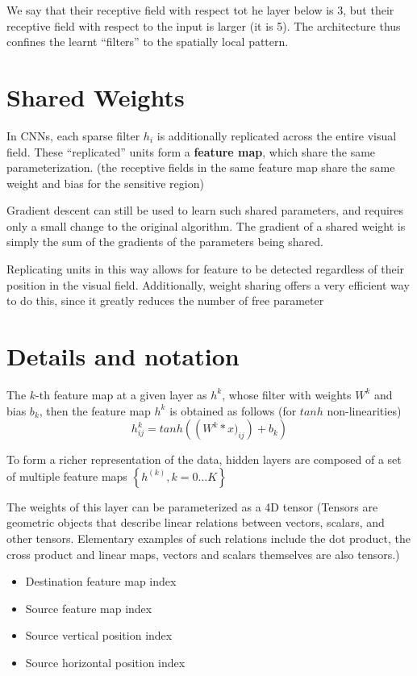 We say that their receptive field with respect tot he layer below is 3,
but their receptive field with respect to the input is larger (it is 5).
The architecture thus confines the learnt ``filters'' to the spatially
local pattern.

\section{Shared Weights}
In CNNs, each sparse filter $h_i$ is additionally replicated across the
entire visual field. These ``replicated'' units form a \textbf{feature
map}, which share the same parameterization. (the receptive fields in the
same feature map share the same weight and bias for the sensitive region)

Gradient descent can still be used to learn such shared parameters, and
requires only a small change to the original algorithm. The gradient of a
shared weight is simply the sum of the gradients of the parameters being
shared.

Replicating units in this way allows for feature to be detected regardless
of their position in the visual field. Additionally, weight sharing offers
a very efficient way to do this, since it greatly reduces the number of
free parameter 

\section{Details and notation}
The $k$-th feature map at a given layer as $h^k$, whose filter with
weights $W^k$ and bias $b_k$, then the feature map $h^k$ is obtained as
follows (for $tanh$ non-linearities)
\[ h^k_{ij} = tanh\left( \left( W^k*x)_{ij} \right) + b_k \right)\]

To form a richer representation of the data, hidden layers are composed of
a set of multiple feature maps $\left\{ h^{(k)}, k = 0\dots K \right\}$

The weights of this layer can be parameterized as a 4D tensor (Tensors are
geometric objects that describe linear relations between vectors, scalars,
and other tensors. Elementary examples of such relations include the dot
product, the cross product and linear maps, vectors and scalars themselves
are also tensors.)
\begin{itemize}
    \item Destination feature map index
    \item Source feature map index
    \item Source vertical position index
    \item Source horizontal position index
\end{itemize}
